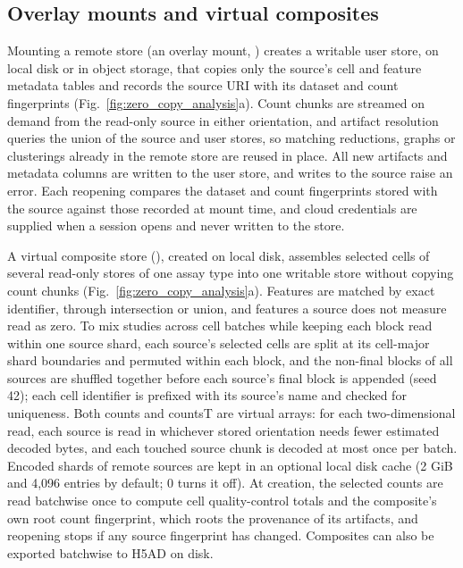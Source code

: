 \documentclass[11pt]{article}
\begin{document}
\subsection*{Overlay mounts and virtual composites}\label{sec:Mounts and composites}

Mounting a remote store (an overlay mount, ) creates a writable user store, on local disk or in object storage, that copies only the source's cell and feature metadata tables and records the source URI with its dataset and count fingerprints (Fig.~\ref{fig:zero_copy_analysis}a). Count chunks are streamed on demand from the read-only source in either orientation, and artifact resolution queries the union of the source and user stores, so matching reductions, graphs or clusterings already in the remote store are reused in place. All new artifacts and metadata columns are written to the user store, and writes to the source raise an error. Each reopening compares the dataset and count fingerprints stored with the source against those recorded at mount time, and cloud credentials are supplied when a session opens and never written to the store.

A virtual composite store (), created on local disk, assembles selected cells of several read-only stores of one assay type into one writable store without copying count chunks (Fig.~\ref{fig:zero_copy_analysis}a). Features are matched by exact identifier, through intersection or union, and features a source does not measure read as zero. To mix studies across cell batches while keeping each block read within one source shard, each source's selected cells are split at its cell-major shard boundaries and permuted within each block, and the non-final blocks of all sources are shuffled together before each source's final block is appended (seed 42); each cell identifier is prefixed with its source's name and checked for uniqueness. Both counts and countsT are virtual arrays: for each two-dimensional read, each source is read in whichever stored orientation needs fewer estimated decoded bytes, and each touched source chunk is decoded at most once per batch. Encoded shards of remote sources are kept in an optional local disk cache (2 GiB and 4,096 entries by default; 0 turns it off). At creation, the selected counts are read batchwise once to compute cell quality-control totals and the composite's own root count fingerprint, which roots the provenance of its artifacts, and reopening stops if any source fingerprint has changed. Composites can also be exported batchwise to H5AD on disk.
\end{document}
